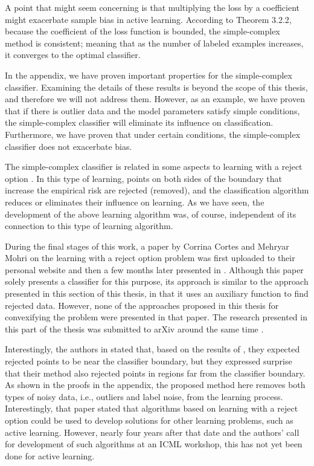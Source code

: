 	A point that might seem concerning is that multiplying the loss by a coefficient might exacerbate sample bias in active learning. According to Theorem 3.2.2, because the coefficient of the loss function is bounded, the simple-complex method is consistent; meaning that as the number of labeled examples increases, it converges to the optimal classifier.
	
	In the appendix, we have proven important properties for the simple-complex classifier. Examining the details of these results is beyond the scope of this thesis, and therefore we will not address them. However, as an example, we have proven that if there is outlier data and the model parameters satisfy simple conditions, the simple-complex classifier will eliminate its influence on classification. Furthermore, we have proven that under certain conditions, the simple-complex classifier does not exacerbate bias.
	
	The simple-complex classifier is related in some aspects to learning with a reject option \cite{herbster1998learning}. In this type of learning, points on both sides of the boundary that increase the empirical risk are rejected (removed), and the classification algorithm reduces or eliminates their influence on learning. As we have seen, the development of the above learning algorithm was, of course, independent of its connection to this type of learning algorithm.
	
	During the final stages of this work, a paper by Corrina Cortes and Mehryar Mohri on the learning with a reject option problem was first uploaded to their personal website and then a few months later presented in \cite{cortes2016learning}. Although this paper solely presents a classifier for this purpose, its approach is similar to the approach presented in this section of this thesis, in that it uses an auxiliary function to find rejected data. However, none of the approaches proposed in this thesis for convexifying the problem were presented in that paper. The research presented in this part of the thesis was submitted to arXiv around the same time \cite{karimi2016statistical}.
	
	Interestingly, the authors in \cite{cortes2016learning} stated that, based on the results of \cite{herbster1998learning}, they expected rejected points to be near the classifier boundary, but they expressed surprise that their method also rejected points in regions far from the classifier boundary. As shown in the proofs in the appendix, the proposed method here removes both types of noisy data, i.e., outliers and label noise, from the learning process. Interestingly, that paper stated that algorithms based on learning with a reject option could be used to develop solutions for other learning problems, such as active learning. However, nearly four years after that date and the authors' call for development of such algorithms at an ICML workshop, this has not yet been done for active learning.
	
